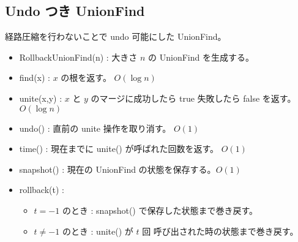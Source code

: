 \subsection{Undo つき UnionFind}

経路圧縮を行わないことで undo 可能にした UnionFind。
\begin{itemize}
    \item RollbackUnionFind(n) : 大きさ $n$ の UnionFind を生成する。
    \item find(x) : $x$ の根を返す。 $O(\log{n})$
    \item unite(x,y) : $x$ と $y$ のマージに成功したら true 失敗したら false を返す。 $O(\log{n})$
    \item undo() : 直前の unite 操作を取り消す。 $O(1)$ 
    \item time() : 現在までに unite() が呼ばれた回数を返す。 $O(1)$
    \item snapshot() : 現在の UnionFind の状態を保存する。$O(1)$
    \item rollback(t) : 
    \begin{itemize}
        \item $t = -1$ のとき : snapshot() で保存した状態まで巻き戻す。
        \item $t \neq -1$ のとき : unite() が $t$ 回 呼び出された時の状態まで巻き戻す。
    \end{itemize}
\end{itemize}


